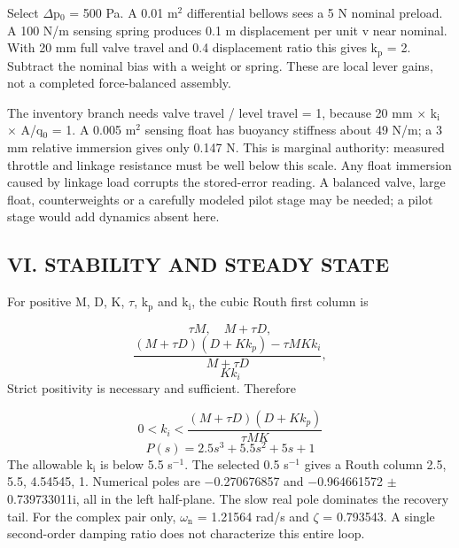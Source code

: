 \documentclass[conference]{IEEEtran}
\begin{document}
Select \ensuremath{\Delta}p\ensuremath{{}_0} = 500 Pa. A 0.01 m\ensuremath{{}^2} differential bellows sees a 5 N nominal preload. A 100 N/m sensing spring produces 0.1 m displacement per unit v near nominal. With 20 mm full valve travel and 0.4 displacement ratio this gives k\ensuremath{_{\mathrm{p}}} = 2. Subtract the nominal bias with a weight or spring. These are local lever gains, not a completed force-balanced assembly.

The inventory branch needs valve travel / level travel = 1, because 20 mm \ensuremath{\times} k\ensuremath{_{\mathrm{i}}} \ensuremath{\times} A/q\ensuremath{{}_0} = 1. A 0.005 m\ensuremath{{}^2} sensing float has buoyancy stiffness about 49 N/m; a 3 mm relative immersion gives only 0.147 N. This is marginal authority: measured throttle and linkage resistance must be well below this scale. Any float immersion caused by linkage load corrupts the stored-error reading. A balanced valve, large float, counterweights or a carefully modeled pilot stage may be needed; a pilot stage would add dynamics absent here.

\subsection*{VI. STABILITY AND STEADY STATE}
For positive M, D, K, \ensuremath{\tau}, k\ensuremath{_{\mathrm{p}}} and k\ensuremath{_{\mathrm{i}}}, the cubic Routh first column is

\begin{equation}\tau M,\quad M+\tau D,\end{equation}
\begin{equation}\frac{(M+\tau D)(D+Kk_p)-\tau MKk_i}{M+\tau D},\end{equation}
\begin{equation}Kk_i\end{equation}
Strict positivity is necessary and sufficient. Therefore

\begin{equation}0<k_i<\frac{(M+\tau D)(D+Kk_p)}{\tau MK}\end{equation}
\begin{equation}P(s)=2.5s^3+5.5s^2+5s+1\end{equation}
The allowable k\ensuremath{_{\mathrm{i}}} is below 5.5 s\ensuremath{{}^{-1}}. The selected 0.5 s\ensuremath{{}^{-1}} gives a Routh column 2.5, 5.5, 4.54545, 1. Numerical poles are \ensuremath{-}0.270676857 and \ensuremath{-}0.964661572 \ensuremath{\pm} 0.739733011i, all in the left half-plane. The slow real pole dominates the recovery tail. For the complex pair only, \ensuremath{\omega}\ensuremath{_{\mathrm{n}}} = 1.21564 rad/s and \ensuremath{\zeta} = 0.793543. A single second-order damping ratio does not characterize this entire loop.
\end{document}
